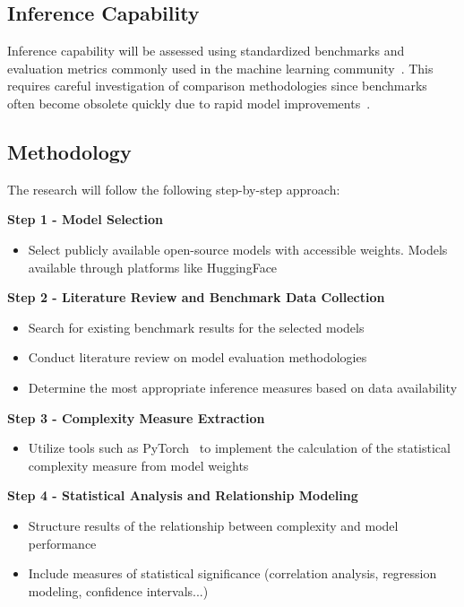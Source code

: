     \subsection{Inference Capability}

        Inference capability will be assessed using standardized benchmarks and evaluation metrics commonly used in the machine learning community~\cite{liang2022holistic, wang2019superglue}. This requires careful investigation of comparison methodologies since benchmarks often become obsolete quickly due to rapid model improvements~\cite{raji2021ai}.

    \subsection{Methodology}

        The research will follow the following step-by-step approach:

        \textbf{Step 1 - Model Selection}
        \begin{itemize}
            \item Select publicly available open-source models with accessible weights. Models available through platforms like HuggingFace
        \end{itemize}

        \textbf{Step 2 - Literature Review and Benchmark Data Collection}
        \begin{itemize}
            \item Search for existing benchmark results for the selected models
            \item Conduct literature review on model evaluation methodologies
            \item Determine the most appropriate inference measures based on data availability
        \end{itemize}

        \textbf{Step 3 - Complexity Measure Extraction}
        \begin{itemize}
            \item Utilize tools such as PyTorch~\cite{paszke2019pytorch} to implement the calculation of the statistical complexity measure from model weights
        \end{itemize}

        \textbf{Step 4 - Statistical Analysis and Relationship Modeling}
        \begin{itemize}
            \item Structure results of the relationship between complexity and model performance
            \item Include measures of statistical significance (correlation analysis, regression modeling, confidence intervals...)
        \end{itemize}
